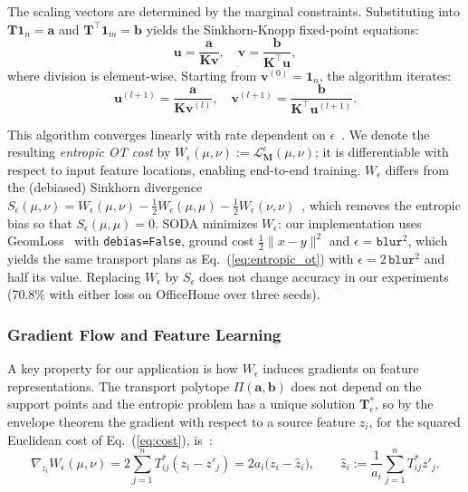The scaling vectors are determined by the marginal constraints. Substituting into $\mathbf{T}\mathbf{1}_n = \mathbf{a}$ and $\mathbf{T}^\top\mathbf{1}_m = \mathbf{b}$ yields the Sinkhorn-Knopp fixed-point equations:
\begin{equation}
    \mathbf{u} = \frac{\mathbf{a}}{\mathbf{K}\mathbf{v}}, \quad \mathbf{v} = \frac{\mathbf{b}}{\mathbf{K}^\top\mathbf{u}},
\end{equation}
where division is element-wise. Starting from $\mathbf{v}^{(0)} = \mathbf{1}_n$, the algorithm iterates:
\begin{equation}
    \mathbf{u}^{(l+1)} = \frac{\mathbf{a}}{\mathbf{K}\mathbf{v}^{(l)}}, \quad \mathbf{v}^{(l+1)} = \frac{\mathbf{b}}{\mathbf{K}^\top\mathbf{u}^{(l+1)}}.
\end{equation}

This algorithm converges linearly with rate dependent on $\epsilon$~\citep{peyre2019computational}. We denote the resulting \emph{entropic OT cost} by $W_\epsilon(\mu, \nu) := \mathcal{L}^\epsilon_{\mathbf{M}}(\mu, \nu)$; it is differentiable with respect to input feature locations, enabling end-to-end training. $W_\epsilon$ differs from the (debiased) Sinkhorn divergence $S_\epsilon(\mu,\nu)=W_\epsilon(\mu,\nu)-\tfrac12W_\epsilon(\mu,\mu)-\tfrac12W_\epsilon(\nu,\nu)$~\citep{feydy2019interpolating}, which removes the entropic bias so that $S_\epsilon(\mu,\mu)=0$. SODA minimizes $W_\epsilon$: our implementation uses GeomLoss~\citep{feydy2019interpolating} with \texttt{debias=False}, ground cost $\tfrac12\|x-y\|^2$ and $\epsilon=\texttt{blur}^2$, which yields the same transport plans as Eq.~(\ref{eq:entropic_ot}) with $\epsilon=2\,\texttt{blur}^2$ and half its value. Replacing $W_\epsilon$ by $S_\epsilon$ does not change accuracy in our experiments (70.8\% with either loss on OfficeHome over three seeds).

\subsubsection{Gradient Flow and Feature Learning}

A key property for our application is how $W_\epsilon$ induces gradients on feature representations. The transport polytope $\Pi(\mathbf a,\mathbf b)$ does not depend on the support points and the entropic problem has a unique solution $\mathbf T^*_\epsilon$, so by the envelope theorem the gradient with respect to a source feature $z_i$, for the squared Euclidean cost of Eq.~(\ref{eq:cost}), is~\citep{peyre2019computational}:
\begin{equation}
    \label{eq:wasserstein_gradient}
    \nabla_{z_i} W_\epsilon(\mu, \nu) = 2 \sum_{j=1}^{n} T^*_{ij} (z_i - z'_j) = 2a_i\big(z_i-\hat z_i\big),\qquad \hat z_i:=\frac{1}{a_i}\sum_{j=1}^n T^*_{ij}z'_j .
\end{equation}

